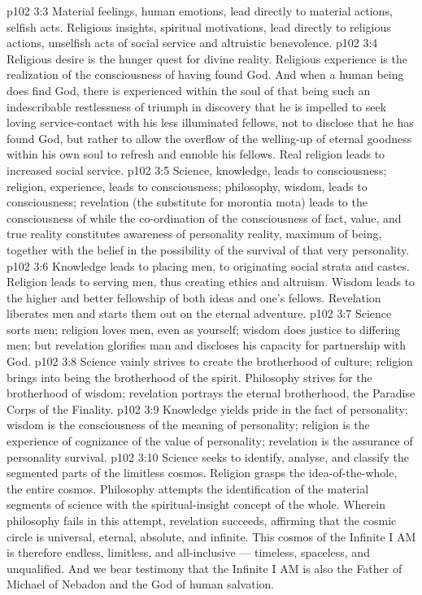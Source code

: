 \vs p102 3:3 Material feelings, human emotions, lead directly to material actions, selfish acts. Religious insights, spiritual motivations, lead directly to religious actions, unselfish acts of social service and altruistic benevolence.
\vs p102 3:4 Religious desire is the hunger quest for divine reality. Religious experience is the realization of the consciousness of having found God. And when a human being does find God, there is experienced within the soul of that being such an indescribable restlessness of triumph in discovery that he is impelled to seek loving service\hyp{}contact with his less illuminated fellows, not to disclose that he has found God, but rather to allow the overflow of the welling\hyp{}up of eternal goodness within his own soul to refresh and ennoble his fellows. Real religion leads to increased social service.
\vs p102 3:5 \pc Science, knowledge, leads to  consciousness; religion, experience, leads to  consciousness; philosophy, wisdom, leads to  consciousness; revelation (the substitute for morontia mota) leads to the consciousness of  while the co\hyp{}ordination of the consciousness of fact, value, and true reality constitutes awareness of personality reality, maximum of being, together with the belief in the possibility of the survival of that very personality.
\vs p102 3:6 \pc Knowledge leads to placing men, to originating social strata and castes. Religion leads to serving men, thus creating ethics and altruism. Wisdom leads to the higher and better fellowship of both ideas and one’s fellows. Revelation liberates men and starts them out on the eternal adventure.
\vs p102 3:7 Science sorts men; religion loves men, even as yourself; wisdom does justice to differing men; but revelation glorifies man and discloses his capacity for partnership with God.
\vs p102 3:8 Science vainly strives to create the brotherhood of culture; religion brings into being the brotherhood of the spirit. Philosophy strives for the brotherhood of wisdom; revelation portrays the eternal brotherhood, the Paradise Corps of the Finality.
\vs p102 3:9 Knowledge yields pride in the fact of personality; wisdom is the consciousness of the meaning of personality; religion is the experience of cognizance of the value of personality; revelation is the assurance of personality survival.
\vs p102 3:10 \pc Science seeks to identify, analyse, and classify the segmented parts of the limitless cosmos. Religion grasps the idea\hyp{}of\hyp{}the\hyp{}whole, the entire cosmos. Philosophy attempts the identification of the material segments of science with the spiritual\hyp{}insight concept of the whole. Wherein philosophy fails in this attempt, revelation succeeds, affirming that the cosmic circle is universal, eternal, absolute, and infinite. This cosmos of the Infinite I AM is therefore endless, limitless, and all\hyp{}inclusive --- timeless, spaceless, and unqualified. And we bear testimony that the Infinite I AM is also the Father of Michael of Nebadon and the God of human salvation.
